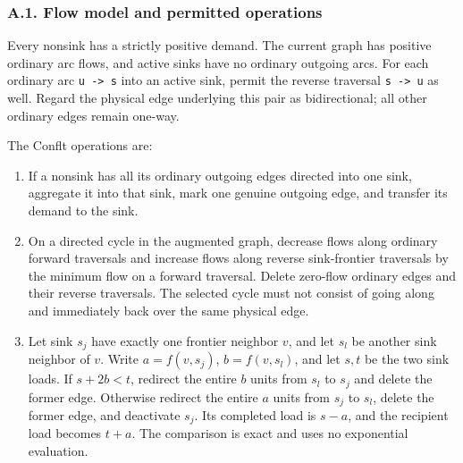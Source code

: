 \hypertarget{af-385fd70686-a.1.-flow-model-and-permitted-operations}{%
\subsubsection{A.1. Flow model and permitted operations}\label{af-385fd70686-a.1.-flow-model-and-permitted-operations}}

Every nonsink has a strictly positive demand. The current graph has positive ordinary arc flows, and active sinks have no ordinary outgoing arcs. For each ordinary arc \texttt{u\ -\textgreater{}\ s} into an active sink, permit the reverse traversal \texttt{s\ -\textgreater{}\ u} as well. Regard the physical edge underlying this pair as bidirectional; all other ordinary edges remain one-way.

The Conflt operations are:

\begin{enumerate}
\def\labelenumi{\arabic{enumi}.}
\tightlist
\item
  If a nonsink has all its ordinary outgoing edges directed into one sink, aggregate it into that sink, mark one genuine outgoing edge, and transfer its demand to the sink.
\item
  On a directed cycle in the augmented graph, decrease flows along ordinary forward traversals and increase flows along reverse sink-frontier traversals by the minimum flow on a forward traversal. Delete zero-flow ordinary edges and their reverse traversals. The selected cycle must not consist of going along and immediately back over the same physical edge.
\item
  Let sink \(s_j\) have exactly one frontier neighbor \(v\), and let \(s_l\) be another sink neighbor of \(v\). Write \(a=f(v,s_j)\), \(b=f(v,s_l)\), and let \(s,t\) be the two sink loads. If \(s+2b<t\), redirect the entire \(b\) units from \(s_l\) to \(s_j\) and delete the former edge. Otherwise redirect the entire \(a\) units from \(s_j\) to \(s_l\), delete the former edge, and deactivate \(s_j\). Its completed load is \(s-a\), and the recipient load becomes \(t+a\). The comparison is exact and uses no exponential evaluation.
\end{enumerate}

